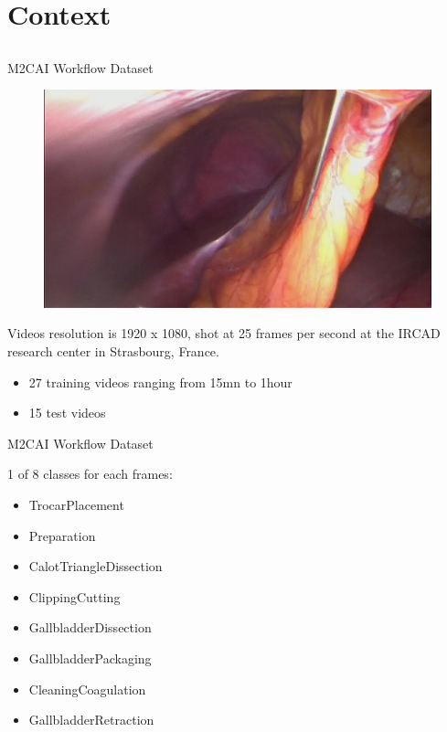 \section{Context} \subsection{}\label{}

\begin{frame}{M2CAI Workflow Dataset}
	
		\begin{figure}
			\centering
			\includegraphics[width=.45\linewidth]{images/m2cai.jpg}
			\label{fig:2images}
		\end{figure}
	
	Videos resolution is 1920 x 1080, shot at 25 frames per second at the IRCAD research center in Strasbourg, France.
	
	\begin{itemize}
		\item 27 training videos ranging from 15mn to 1hour%
		\item 15 test videos %
	\end{itemize}
	
\end{frame}

\begin{frame}{M2CAI Workflow Dataset}

	1 of 8 classes for each frames:
	\begin{itemize}
		\item TrocarPlacement
		\item Preparation
		\item CalotTriangleDissection
       	\item ClippingCutting
       	\item GallbladderDissection
       	\item GallbladderPackaging
       	\item CleaningCoagulation
       	\item GallbladderRetraction
    \end{itemize}

\end{frame}

